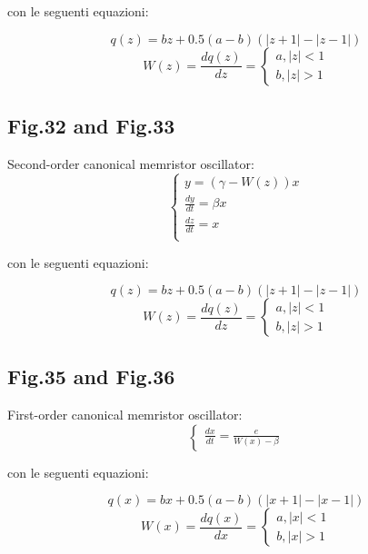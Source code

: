 \documentclass[12pt, a4paper]{book}
\begin{document}
con le seguenti equazioni:

\begin{equation}
q(z)=bz+0.5(a-b)(|z+1|-|z-1|)
\end{equation}
\begin{equation}
W(z)=\frac{dq(z)}{dz}=
\begin{cases}
a, |z|<1
\\
b, |z|>1
\end{cases}
\end{equation}

\subsection{Fig.32 and Fig.33}
Second-order canonical memristor oscillator:
\begin{equation}
\begin{cases}
y=(\gamma-W(z))x
\\
\frac{dy}{dt}=\beta x
\\
\frac{dz}{dt}=x
\\
\end{cases}
\end{equation}

con le seguenti equazioni:

\begin{equation}
q(z)=bz+0.5(a-b)(|z+1|-|z-1|)
\end{equation}
\begin{equation}
W(z)=\frac{dq(z)}{dz}=
\begin{cases}
a, |z|<1
\\
b, |z|>1
\end{cases}
\end{equation}

\subsection{Fig.35 and Fig.36}
First-order canonical memristor oscillator:
\begin{equation}
\begin{cases}
\frac{dx}{dt}=\frac{e}{W(x)-\beta}
\end{cases}
\end{equation}

con le seguenti equazioni:

\begin{equation}
q(x)=bx+0.5(a-b)(|x+1|-|x-1|)
\end{equation}
\begin{equation}
W(x)=\frac{dq(x)}{dx}=
\begin{cases}
a, |x|<1
\\
b, |x|>1
\end{cases}
\end{equation}
\end{document}
